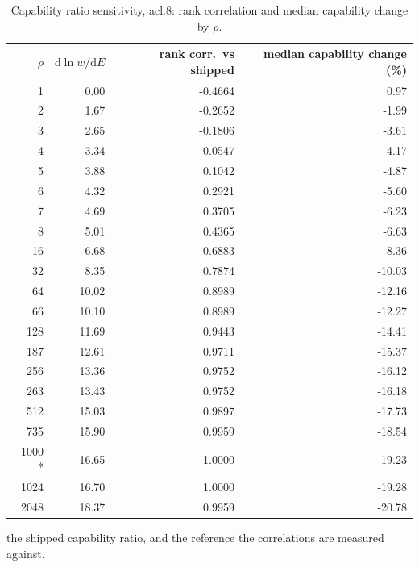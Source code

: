 \begin{table}[htbp]
  \centering
  \caption{Capability ratio sensitivity, acl.8: rank correlation and median capability change by $\rho$.}
  \label{tab:rho-acl-8-summary}
  \begin{tabular}{r r r r}
    \toprule
    $\rho$ & $\mathrm{d}\ln w/\mathrm{d}E$ & rank corr.\ vs shipped & median capability change (\%) \\
    \midrule
    1 & 0.00 & -0.4664 & 0.97 \\
    2 & 1.67 & -0.2652 & -1.99 \\
    3 & 2.65 & -0.1806 & -3.61 \\
    4 & 3.34 & -0.0547 & -4.17 \\
    5 & 3.88 & 0.1042 & -4.87 \\
    6 & 4.32 & 0.2921 & -5.60 \\
    7 & 4.69 & 0.3705 & -6.23 \\
    8 & 5.01 & 0.4365 & -6.63 \\
    16 & 6.68 & 0.6883 & -8.36 \\
    32 & 8.35 & 0.7874 & -10.03 \\
    64 & 10.02 & 0.8989 & -12.16 \\
    66 & 10.10 & 0.8989 & -12.27 \\
    128 & 11.69 & 0.9443 & -14.41 \\
    187 & 12.61 & 0.9711 & -15.37 \\
    256 & 13.36 & 0.9752 & -16.12 \\
    263 & 13.43 & 0.9752 & -16.18 \\
    512 & 15.03 & 0.9897 & -17.73 \\
    735 & 15.90 & 0.9959 & -18.54 \\
    1000 * & 16.65 & 1.0000 & -19.23 \\
    1024 & 16.70 & 1.0000 & -19.28 \\
    2048 & 18.37 & 0.9959 & -20.78 \\
    \bottomrule
  \end{tabular}
  \par\smallskip\footnotesize * the shipped capability ratio, and the reference the correlations are measured against.
\end{table}
